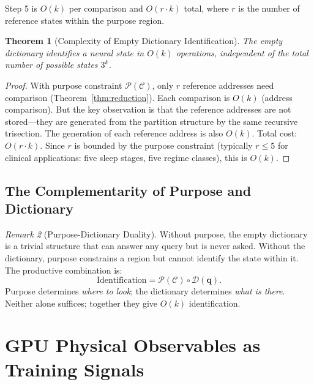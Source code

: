 \documentclass[aps,prd,twocolumn,superscriptaddress,floatfix,nofootinbib]{revtex4-2}
\newtheorem{theorem}{Theorem}[section]
\theoremstyle{remark}
\newtheorem{remark}[theorem]{Remark}
\newcommand{\qvec}{\mathbf{q}}
\newcommand{\Purpose}{\mathcal{P}}
\newcommand{\Context}{\mathcal{C}}
\newcommand{\Dict}{\mathcal{D}}
\begin{document}
Step 5 is $O(k)$ per comparison and $O(r \cdot k)$ total, where $r$ is the number of reference states within the purpose region.

\begin{theorem}[Complexity of Empty Dictionary Identification]
\label{thm:complexity}
The empty dictionary identifies a neural state in $O(k)$ operations, independent of the total number of possible states $3^k$.
\end{theorem}

\begin{proof}
With purpose constraint $\Purpose(\Context)$, only $r$ reference addresses need comparison (Theorem~\ref{thm:reduction}).
Each comparison is $O(k)$ (address comparison).
But the key observation is that the reference addresses are not stored---they are generated from the partition structure by the same recursive trisection.
The generation of each reference address is also $O(k)$.
Total cost: $O(r \cdot k)$.
Since $r$ is bounded by the purpose constraint (typically $r \leq 5$ for clinical applications: five sleep stages, five regime classes), this is $O(k)$.
\end{proof}

\subsection{The Complementarity of Purpose and Dictionary}

\begin{remark}[Purpose-Dictionary Duality]
\label{rem:duality}
Without purpose, the empty dictionary is a trivial structure that can answer any query but is never asked.
Without the dictionary, purpose constrains a region but cannot identify the state within it.
The productive combination is:
\begin{equation}
\text{Identification} = \Purpose(\Context) \circ \Dict(\qvec).
\end{equation}
Purpose determines \emph{where to look}; the dictionary determines \emph{what is there}.
Neither alone suffices; together they give $O(k)$ identification.
\end{remark}


\section{GPU Physical Observables as Training Signals}
\label{sec:gpu}
\end{document}
